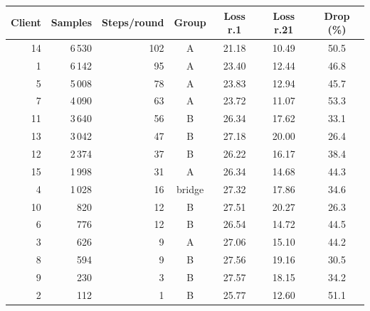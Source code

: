 \begin{tabular}{r r r c c c c}
\toprule
Client & Samples & Steps/round & Group & Loss r.1 & Loss r.21 & Drop (\%)\\
\midrule
14 & 6\,530 & 102 & A & 21.18 & 10.49 & 50.5\\
1 & 6\,142 & 95 & A & 23.40 & 12.44 & 46.8\\
5 & 5\,008 & 78 & A & 23.83 & 12.94 & 45.7\\
7 & 4\,090 & 63 & A & 23.72 & 11.07 & 53.3\\
11 & 3\,640 & 56 & B & 26.34 & 17.62 & 33.1\\
13 & 3\,042 & 47 & B & 27.18 & 20.00 & 26.4\\
12 & 2\,374 & 37 & B & 26.22 & 16.17 & 38.4\\
15 & 1\,998 & 31 & A & 26.34 & 14.68 & 44.3\\
4 & 1\,028 & 16 & bridge & 27.32 & 17.86 & 34.6\\
10 & 820 & 12 & B & 27.51 & 20.27 & 26.3\\
6 & 776 & 12 & B & 26.54 & 14.72 & 44.5\\
3 & 626 & 9 & A & 27.06 & 15.10 & 44.2\\
8 & 594 & 9 & B & 27.56 & 19.16 & 30.5\\
9 & 230 & 3 & B & 27.57 & 18.15 & 34.2\\
2 & 112 & 1 & B & 25.77 & 12.60 & 51.1\\
\bottomrule
\end{tabular}
